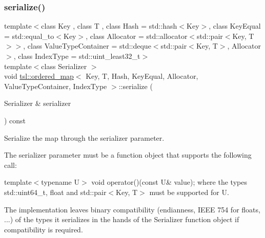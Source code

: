 \subsubsection{\texorpdfstring{serialize()}{serialize()}}
{\footnotesize\ttfamily template$<$class Key , class T , class Hash  = std\+::hash$<$\+Key$>$, class Key\+Equal  = std\+::equal\+\_\+to$<$\+Key$>$, class Allocator  = std\+::allocator$<$std\+::pair$<$\+Key, T$>$$>$, class Value\+Type\+Container  = std\+::deque$<$std\+::pair$<$\+Key, T$>$, Allocator$>$, class Index\+Type  = std\+::uint\+\_\+least32\+\_\+t$>$ \\
template$<$class Serializer $>$ \\
void \mbox{\hyperlink{classtsl_1_1ordered__map}{tsl\+::ordered\+\_\+map}}$<$ Key, T, Hash, Key\+Equal, Allocator, Value\+Type\+Container, Index\+Type $>$\+::serialize (\begin{DoxyParamCaption}\item[{Serializer \&}]{serializer }\end{DoxyParamCaption}) const\hspace{0.3cm}{\ttfamily [inline]}}

Serialize the map through the {\ttfamily serializer} parameter.

The {\ttfamily serializer} parameter must be a function object that supports the following call\+:
\begin{DoxyItemize}
\item {\ttfamily template$<$typename U$>$ void operator()(const U\& value);} where the types {\ttfamily std\+::uint64\+\_\+t}, {\ttfamily float} and {\ttfamily std\+::pair$<$Key, T$>$} must be supported for U.
\end{DoxyItemize}

The implementation leaves binary compatibility (endianness, I\+E\+EE 754 for floats, ...) of the types it serializes in the hands of the {\ttfamily Serializer} function object if compatibility is required. \mbox{\label{classtsl_1_1ordered__map_a73b41d7b710c3986cdf34a21863dbfb2}} 
